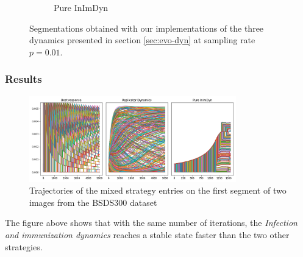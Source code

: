 \documentclass{beamer}
\begin{document}
\begin{frame}
\begin{figure}
\begin{subfigure}[b]{0.25\textwidth}
            \caption{Pure InImDyn}
        \end{subfigure}
           \caption{Segmentations obtained with our implementations of the three dynamics presented in section \ref{sec:evo-dyn} at sampling rate $p=0.01$.}
           \label{fig:results-dynamics}
    \end{figure}
\end{frame}

\begin{frame}
    \frametitle{Results}
    \begin{figure}
        \centering
        \includegraphics[width=0.8\textwidth]{../figures/trajectories/102061.png}
        \caption{Trajectories of the mixed strategy entries on the first segment of two images from the BSDS300 dataset}
        \label{fig:trajectories}
    \end{figure}
    The figure above shows that with the same number of iterations, the \textit{Infection and immunization dynamics} reaches a stable state faster than the two other strategies.
\end{frame}
\end{document}
